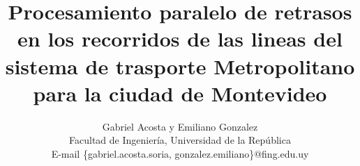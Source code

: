 \documentclass[journal]{IEEEtran}
\begin{document}
%
\title{Procesamiento paralelo de retrasos en los recorridos de las lineas del sistema de trasporte Metropolitano para la ciudad de Montevideo}
%
%
%

\author{Gabriel Acosta y Emiliano Gonzalez \\
Facultad de Ingeniería, Universidad de la República\\

E-mail \{gabriel.acosta.soria, gonzalez.emiliano\}@fing.edu.uy \\        }

% 
%
\end{document}
